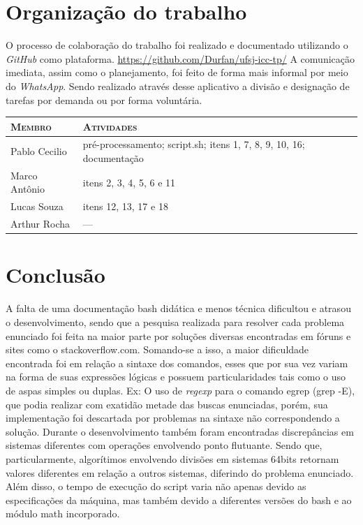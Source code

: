 \documentclass[12pt]{article}
\begin{document}
	\section{Organização do trabalho}
	O processo de colaboração do trabalho foi realizado e documentado utilizando o \textit{GitHub} como plataforma. \url{https://github.com/Durfan/ufsj-icc-tp/}
	A comunicação imediata, assim como o planejamento, foi feito de forma mais informal por meio do \textit{WhatsApp}. Sendo realizado através desse aplicativo a divisão e designação de tarefas por demanda ou por forma voluntária.
	\begin{table}[!h]
		\begin{tabular}{p{5cm}p{7.5cm}}
			
			\textsc{Membro}      & \textsc{Atividades} \\ 
			\hline
			Pablo Cecilio & pré-processamento; script.sh; itens 1, 7, 8, 9, 10, 16; documentação \\ 
			Marco Antônio & itens 2, 3, 4, 5, 6 e 11 \\
			Lucas Souza & itens 12, 13, 17 e 18 \\
			Arthur Rocha & --- \\
		\end{tabular}
	\end{table}
	\section{Conclusão}
	A falta de uma documentação bash didática e menos técnica dificultou e atrasou o desenvolvimento, sendo que a pesquisa realizada para resolver cada problema enunciado  foi feita na maior parte por soluções diversas encontradas em fóruns e sites como o stackoverflow.com. Somando-se a isso, a maior dificuldade encontrada foi em relação a sintaxe dos comandos, esses que por sua vez variam na forma de suas expressões lógicas e possuem particularidades tais como o uso de aspas simples ou duplas. Ex: O uso de \textit{regexp} para o comando egrep (grep -E), que podia realizar com exatidão metade das buscas enunciadas, porém, sua implementação foi descartada por problemas na sintaxe não correspondendo a solução.
	Durante o desenvolvimento também foram encontradas discrepâncias em sistemas diferentes com operações envolvendo ponto flutuante. Sendo que, particularmente, algorítimos envolvendo divisões em sistemas 64bits retornam valores diferentes em relação a outros sistemas, diferindo do problema enunciado. Além disso, o tempo de execução do script varia não apenas devido as especificações da máquina, mas também devido a diferentes versões do bash e ao módulo math incorporado.
	\pagebreak
\end{document}
